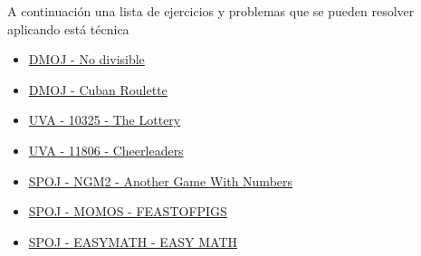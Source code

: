 A continuación una lista de ejercicios y problemas que se pueden resolver aplicando está técnica

\begin{itemize}
	\item \href{https://dmoj.uclv.edu.cu/problem/divide}{DMOJ - No divisible}
	\item \href{https://dmoj.uclv.edu.cu/problem/oci19day1a}{DMOJ - Cuban Roulette}
	\item \href{https://onlinejudge.org/index.php?option=onlinejudge&page=show_problem&problem=1266}{UVA - 10325 - The Lottery}
	\item \href{https://onlinejudge.org/index.php?option=com_onlinejudge&Itemid=8&page=show_problem&problem=2906}{UVA - 11806 - Cheerleaders}
	\item \href{https://www.spoj.com/problems/NGM2/}{SPOJ - NGM2 - Another Game With Numbers}
	\item \href{https://www.spoj.com/problems/MOMOS/}{SPOJ - MOMOS - FEASTOFPIGS}
	\item \href{https://www.spoj.com/problems/EASYMATH/}{SPOJ - EASYMATH - EASY MATH}
\end{itemize}